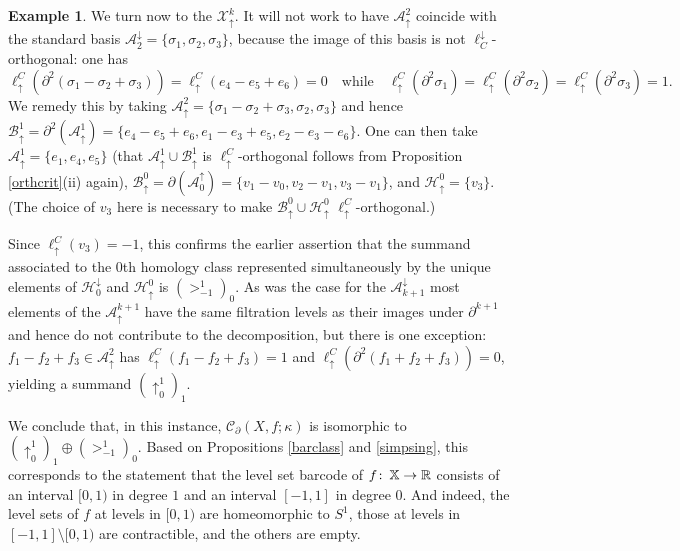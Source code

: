 \documentclass[11pt]{amsart}
\theoremstyle{definition}
\newtheorem{ex}[theorem]{Example}
\theoremstyle{remark}
\numberwithin{equation}{section}
\def\co{\colon\thinspace}
\def\R{\mathbb{R}}
\begin{document}
\begin{ex}
We turn now to the $\mathcal{X}_{\uparrow}^{k}$.  It will not work to have $\mathcal{A}_{\uparrow}^{2}$ coincide with the standard basis $\mathcal{A}^{\downarrow}_{2}=\{\sigma_1,\sigma_2,\sigma_3\}$, because the image of this basis is not $\ell_{C}^{\downarrow}$-orthogonal: one has \[ \ell^{C}_{\uparrow}\left(\partial^2 (\sigma_1-\sigma_2+\sigma_3)\right)=\ell^{C}_{\uparrow}(e_4-e_5+e_6)=0 \quad \mbox{while}\quad \ell_{\uparrow}^{C}(\partial^2 \sigma_1)=\ell_{\uparrow}^{C}(\partial^2 \sigma_2)=\ell_{\uparrow}^{C}(\partial^2 \sigma_3)=1.\]  We remedy this by taking $\mathcal{A}_{\uparrow}^{2}=\{\sigma_1-\sigma_2+\sigma_3,\sigma_2,\sigma_3\}$ and hence $\mathcal{B}_{\uparrow}^{1}=\partial^2(\mathcal{A}_{\uparrow}^{1})=\{e_4-e_5+e_6,e_1-e_3+e_5,e_2-e_3-e_6\}$.  One can then take $\mathcal{A}_{\uparrow}^{1}=\{e_1,e_4,e_5\}$ (that $\mathcal{A}_{\uparrow}^{1}\cup \mathcal{B}_{\uparrow}^{1}$ is $\ell_{\uparrow}^{C}$-orthogonal follows from Proposition \ref{orthcrit}(ii) again), $\mathcal{B}_{\uparrow}^{0}=\partial(\mathcal{A}^{\uparrow}_{0})=\{v_1-v_0,v_2-v_1,v_3-v_1\}$, and $\mathcal{H}_{\uparrow}^{0}=\{v_3\}$.  (The choice of $v_3$ here is necessary to make $\mathcal{B}_{\uparrow}^{0}\cup \mathcal{H}_{\uparrow}^{0}$ $\ell_{\uparrow}^{C}$-orthogonal.)

Since $\ell_{\uparrow}^{C}(v_3)=-1$, this confirms the earlier assertion that the summand associated to the $0$th homology class represented simultaneously by the unique elements of $\mathcal{H}_{0}^{\downarrow}$ and $\mathcal{H}_{\uparrow}^{0}$ is $(>_{-1}^{1})_{0}$.  As was the case for the $\mathcal{A}^{\downarrow}_{k+1}$ most elements of the $\mathcal{A}_{\uparrow}^{k+1}$ have the same filtration levels as their images under $\partial^{k+1}$ and hence do not contribute to the decomposition, but there is one exception: $f_1-f_2+f_3\in \mathcal{A}_{\uparrow}^{2}$ has $\ell_{\uparrow}^{C}(f_1-f_2+f_3)=1$ and $\ell_{\uparrow}^{C}(\partial^2(f_1+f_2+f_3))=0$, yielding a summand $(\uparrow_{0}^{1})_1$.

We conclude that, in this instance, $\mathcal{C}_{\partial}(X,f;\kappa)$  is isomorphic to $(\uparrow_{0}^{1})_1\oplus (>_{-1}^{1})_{0}$.  Based on Propositions \ref{barclass} and \ref{simpsing}, this corresponds to the statement that the level set barcode of $f\co\mathbb{X}\to \R$ consists of an interval $[0,1)$ in degree $1$ and an interval $[-1,1]$ in degree $0$.  And indeed, the level sets of $f$ at levels in $[0,1)$ are homeomorphic to $S^1$, those at levels in $[-1,1]\setminus[0,1)$ are contractible, and the others are empty.	
\end{ex}
\end{document}
